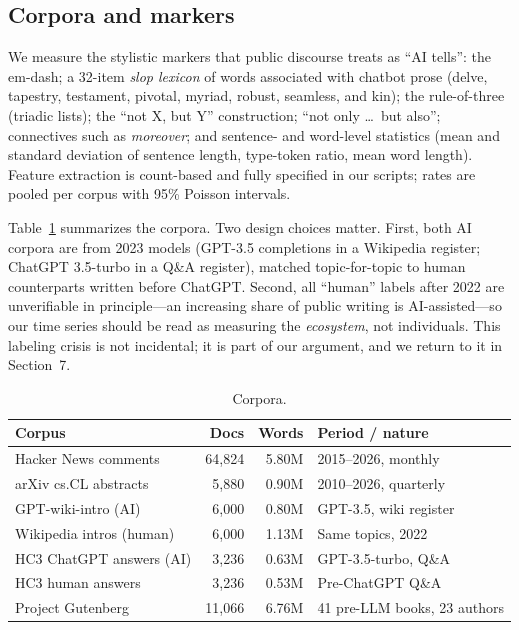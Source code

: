 \documentclass[sigconf,nonacm]{acmart}
\begin{document}
\subsection{Corpora and markers}

We measure the stylistic markers that public discourse treats as ``AI tells'': the em-dash; a 32-item \emph{slop lexicon} of words associated with chatbot prose (delve, tapestry, testament, pivotal, myriad, robust, seamless, and kin); the rule-of-three (triadic lists); the ``not X, but Y'' construction; ``not only \ldots\ but also''; connectives such as \emph{moreover}; and sentence- and word-level statistics (mean and standard deviation of sentence length, type-token ratio, mean word length). Feature extraction is count-based and fully specified in our scripts; rates are pooled per corpus with 95\% Poisson intervals.

Table~\ref{tab:corpora} summarizes the corpora. Two design choices matter. First, both AI corpora are from 2023 models (GPT-3.5 completions in a Wikipedia register; ChatGPT 3.5-turbo in a Q\&A register), matched topic-for-topic to human counterparts written before ChatGPT. Second, all ``human'' labels after 2022 are unverifiable in principle---an increasing share of public writing is AI-assisted---so our time series should be read as measuring the \emph{ecosystem}, not individuals. This labeling crisis is not incidental; it is part of our argument, and we return to it in Section~7.

\begin{table}[t]
\centering
\small
\caption{Corpora.}
\label{tab:corpora}
\begin{tabular}{@{}lrrl@{}}
\toprule
Corpus & Docs & Words & Period / nature \\
\midrule
Hacker News comments & 64{,}824 & 5.80M & 2015--2026, monthly \\
arXiv cs.CL abstracts & 5{,}880 & 0.90M & 2010--2026, quarterly \\
GPT-wiki-intro (AI) & 6{,}000 & 0.80M & GPT-3.5, wiki register \\
Wikipedia intros (human) & 6{,}000 & 1.13M & Same topics, 2022 \\
HC3 ChatGPT answers (AI) & 3{,}236 & 0.63M & GPT-3.5-turbo, Q\&A \\
HC3 human answers & 3{,}236 & 0.53M & Pre-ChatGPT Q\&A \\
Project Gutenberg & 11{,}066 & 6.76M & 41 pre-LLM books, 23 authors \\
\bottomrule
\end{tabular}
\end{table}
\end{document}

